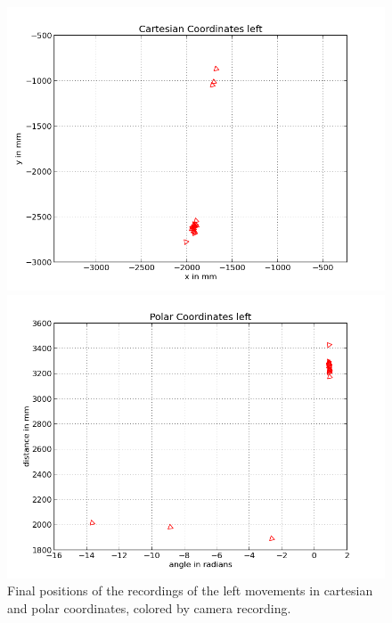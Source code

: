 \documentclass{scrartcl}
\begin{document}
\begin{figure}[H]
\centering
\begin{minipage}{.5\textwidth}
  \centering
  \includegraphics[width=.8\linewidth]{img/left_f.png}
\end{minipage}%
\begin{minipage}{.5\textwidth}
  \centering
  \includegraphics[width=.8\linewidth]{img/left_pc_f.png}
\end{minipage}
\caption{Final positions of the recordings of the left movements in cartesian and polar coordinates, colored by camera recording.}
\label{fig:left_f}
\end{figure}
\end{document}
